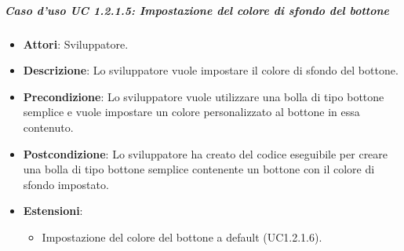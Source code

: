 \subparagraph{Caso d'uso UC 1.2.1.5: Impostazione del colore di sfondo del bottone}

\FloatBarrier
\begin{itemize}
\item\textbf{Attori}: Sviluppatore.
\item\textbf{Descrizione}: Lo sviluppatore vuole impostare il colore di sfondo del bottone.
\item\textbf{Precondizione}: Lo sviluppatore vuole utilizzare una bolla di tipo bottone semplice e vuole impostare un colore personalizzato al bottone in essa contenuto.
\item\textbf{Postcondizione}: Lo sviluppatore ha creato del codice eseguibile per creare una bolla di tipo bottone semplice contenente un bottone con il colore di sfondo impostato.
\item \textbf{Estensioni}: 
\begin{itemize}
\item Impostazione del colore del bottone a default (UC1.2.1.6).
\end{itemize}
\end{itemize}
